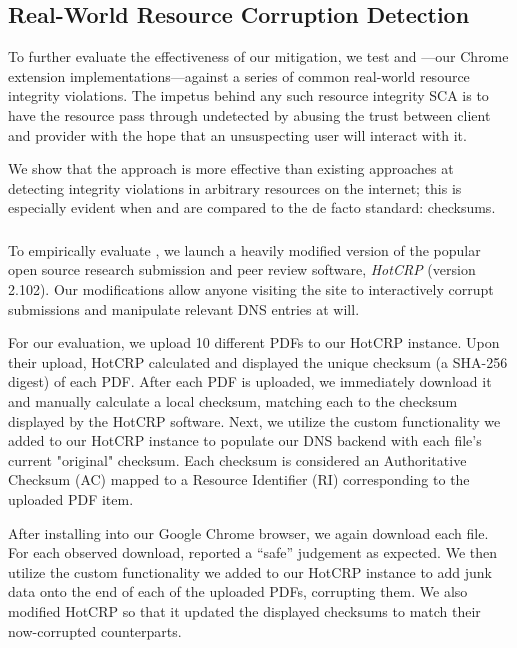 \subsection{Real-World Resource Corruption Detection}

To further evaluate the effectiveness of our mitigation, we test \DNSSYS{} and
\DHTSYS{}---our \SYSTEM{} Chrome extension
implementations---against a series of common real-world resource integrity
violations. The impetus behind any such resource integrity SCA is to have the
resource pass through undetected by abusing the trust between client and
provider with the hope that an unsuspecting user will interact with it.

We show that the \SYSTEM{} approach is more effective than existing approaches
at detecting integrity violations in arbitrary resources on the internet; this
is especially evident when \DNSSYS{} and \DHTSYS{} are compared to the de facto
standard: checksums.

\subsubsection{\DNSSYS{}}

To empirically evaluate \DNSSYS{}, we launch a heavily modified version of the
popular open source research submission and peer review software, \emph{HotCRP}
(version 2.102). Our modifications allow anyone visiting the site to
interactively corrupt submissions and manipulate relevant DNS entries at will.

For our evaluation, we upload 10 different \CONFERENCE{} PDFs to our HotCRP
instance. Upon their upload, HotCRP calculated and displayed the unique checksum
(a SHA-256 digest) of each PDF. After each PDF is uploaded, we immediately
download it and manually calculate a local checksum, matching each to the
checksum displayed by the HotCRP software. Next, we utilize the custom
functionality we added to our HotCRP instance to populate our DNS backend with
each file's current "original" checksum. Each checksum is considered an
Authoritative Checksum (AC) mapped to a Resource Identifier (RI) corresponding
to the uploaded PDF item.

After installing \DNSSYS{} into our Google Chrome browser, we again download
each file. For each observed download, \DNSSYS{} reported a ``safe'' judgement
as expected. We then utilize the custom functionality we added to our HotCRP
instance to add junk data onto the end of each of the uploaded PDFs, corrupting
them. We also modified HotCRP so that it updated the displayed checksums to
match their now-corrupted counterparts.

